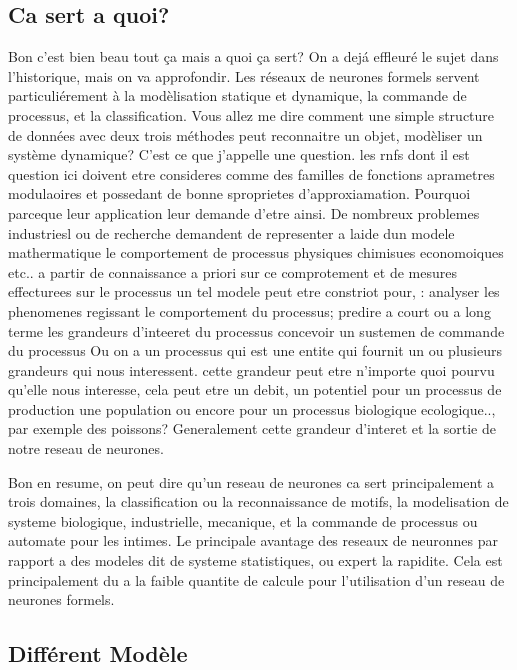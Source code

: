 \subsection{Ca sert a quoi?}
Bon c'est bien beau tout \c ca mais a quoi  \c ca sert? On a
dej\'a effleur\'e le sujet dans l'historique, mais on va
approfondir. Les r\'eseaux de neurones formels servent
particuli\'erement \`a la mod\`elisation statique et dynamique, la
commande de processus, et la classification. Vous allez me dire
comment une simple structure de donn\'ees avec deux trois m\'ethodes
peut reconnaitre un objet, mod\`eliser un syst\`eme dynamique? C'est
ce que j'appelle une question.
les rnfs dont il est question ici doivent etre consideres comme des familles de fonctions aprametres
modulaoires et possedant de bonne sproprietes
d'approxiamation. Pourquoi parceque leur application leur demande
d'etre ainsi.
De nombreux problemes industriesl ou de recherche demandent de
representer a laide dun modele mathermatique le comportement de
processus physiques chimisues economoiques etc.. a partir de
connaissance a priori sur ce comprotement et de mesures effecturees
sur le processus un tel modele peut etre constriot pour, :
analyser les phenomenes regissant le comportement du processus;
predire a court ou a long terme les grandeurs d'inteeret du processus
concevoir un sustemen de commande du processus
Ou on a un processus qui est une entite qui fournit un ou plusieurs
grandeurs qui nous interessent. cette grandeur peut etre n'importe
quoi pourvu qu'elle nous interesse, cela peut etre un debit, un
potentiel pour un processus de production une population ou encore
pour un processus biologique ecologique.., par exemple des poissons?
Generalement cette grandeur d'interet et la sortie de notre reseau de
neurones.

Bon en resume, on peut dire qu'un reseau de neurones ca sert
principalement a trois domaines, la classification ou la
reconnaissance de motifs, la modelisation de systeme biologique,
industrielle, mecanique, et la commande de processus ou automate pour
les intimes. Le principale avantage des reseaux de neuronnes par
rapport a des modeles dit de systeme statistiques, ou expert la
rapidite. Cela est principalement du a la faible quantite de calcule
pour l'utilisation  d'un reseau de neurones formels.
\subsection{Diff\'erent Mod\`ele}


